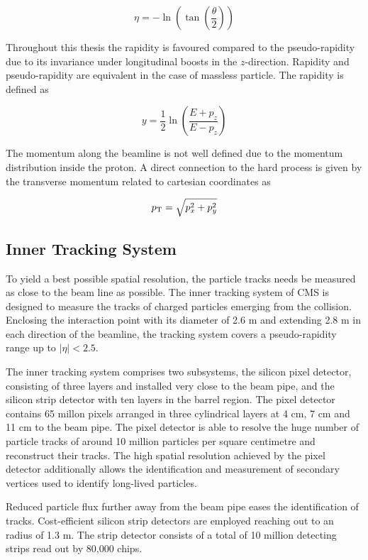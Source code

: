 \begin{equation}
    \eta = - \ln \left( \tan \left( \frac{\theta}{2} \right) \right)
\end{equation}

Throughout this thesis the rapidity is favoured compared to the pseudo-rapidity
due to its invariance under longitudinal boosts in the $z$-direction. Rapidity
and pseudo-rapidity are equivalent in the case of massless particle. The
rapidity is defined as

\begin{equation}
    y = \frac{1}{2} \ln \left( \frac{E + p_z}{E - p_z} \right) 
\end{equation}

The momentum along the beamline is not well defined due to the momentum
distribution inside the proton. A direct connection to the hard process is given
by the transverse momentum \pt related to cartesian coordinates as

\begin{equation}
    p_{\mathrm{T}} = \sqrt{p_x^2 + p_y^2}
\end{equation}

\subsection{Inner Tracking System}

To yield a best possible spatial resolution, the particle tracks needs be
measured as close to the beam line as possible. The inner tracking system of CMS
is designed to measure the tracks of charged particles emerging from the
collision. Enclosing the interaction point with its diameter of 2.6 m and
extending 2.8 m in each direction of the beamline, the tracking system covers a
pseudo-rapidity range up to $|\eta| < 2.5$. 

The inner tracking system comprises two subsystems, the silicon pixel detector,
consisting of three layers and installed very close to the beam pipe, and the
silicon strip detector with ten layers in the barrel region. The pixel detector
contains 65 millon pixels arranged in three cylindrical layers at 4 cm, 7 cm and
11 cm to the beam pipe. The pixel detector is able to resolve the huge number of
particle tracks of around 10 million particles per square centimetre and
reconstruct their tracks. The high spatial resolution achieved by the pixel
detector additionally allows the identification and measurement of secondary
vertices used to identify long-lived particles.

Reduced particle flux further away from the beam pipe eases the identification
of tracks. Cost-efficient silicon strip detectors are employed reaching out to
an radius of 1.3 m. The strip detector consists of a total of 10 million
detecting strips read out by 80,000 chips. 

